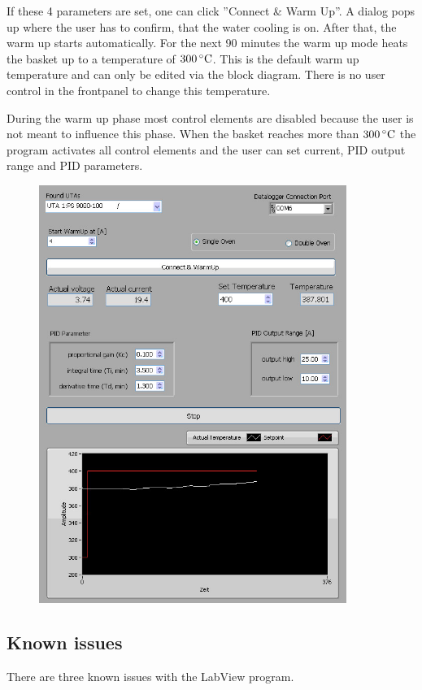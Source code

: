 \documentclass[parskip,12pt,headsepline,a4paper] {scrbook}
\begin{document}
If these 4 parameters are set, one can click ''Connect \& Warm Up''. A dialog pops up where the user has to confirm, that the water cooling is on. After that, the warm up starts automatically. For the next 90 minutes the warm up mode heats the basket up to a temperature of $\unit[300]{^\circ C}$. This is the default warm up temperature and can only be edited via the block diagram. There is no user control in the frontpanel to change this temperature.

During the warm up phase most control elements are disabled because the user is not meant to influence this phase. When the basket reaches more than $\unit[300]{^\circ C}$ the program activates all control elements and the user can set current, PID output range and PID parameters.

\begin{figure}[ht]
\centerline{
\includegraphics[width=10cm]{./labview/frontpanel.jpg}}
\end{figure}

\subsection{Known issues}
\vspace{-1\baselineskip}
There are three known issues with the LabView program.
\end{document}
